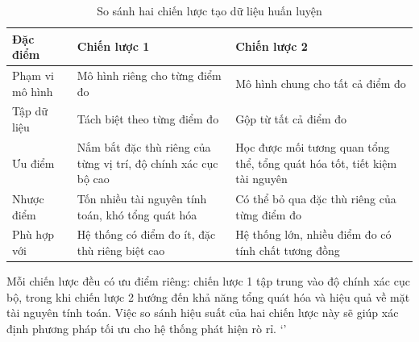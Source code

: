 \begin{table}[h]
    \centering
    \begin{tabular}{|p{4cm}|p{5cm}|p{5cm}|}
        \hline
        \textbf{Đặc điểm} & \textbf{Chiến lược 1} & \textbf{Chiến lược 2} \\
        \hline
        Phạm vi mô hình & Mô hình riêng cho từng điểm đo & Mô hình chung cho tất cả điểm đo \\
        \hline
        Tập dữ liệu & Tách biệt theo từng điểm đo & Gộp từ tất cả điểm đo \\
        \hline
        Ưu điểm & Nắm bắt đặc thù riêng của từng vị trí, độ chính xác cục bộ cao & Học được mối tương quan tổng thể, tổng quát hóa tốt, tiết kiệm tài nguyên \\
        \hline
        Nhược điểm & Tốn nhiều tài nguyên tính toán, khó tổng quát hóa & Có thể bỏ qua đặc thù riêng của từng điểm đo \\
        \hline
        Phù hợp với & Hệ thống có điểm đo ít, đặc thù riêng biệt cao & Hệ thống lớn, nhiều điểm đo có tính chất tương đồng \\
        \hline
    \end{tabular}
    \caption{So sánh hai chiến lược tạo dữ liệu huấn luyện}
    \label{tab:training_strategy_comparison}
\end{table}

Mỗi chiến lược đều có ưu điểm riêng: chiến lược 1 tập trung vào độ chính xác cục bộ, trong khi chiến lược 2 hướng đến khả năng tổng quát hóa và hiệu quả về mặt tài nguyên tính toán. Việc so sánh hiệu suất của hai chiến lược này sẽ giúp xác định phương pháp tối ưu cho hệ thống phát hiện rò rỉ.
`'